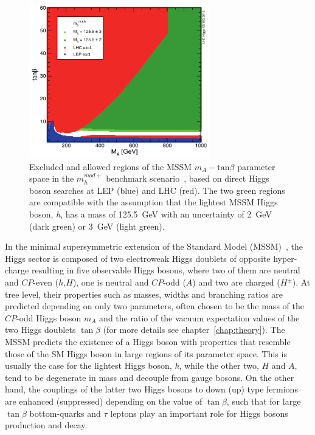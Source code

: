 \begin{figure}[tp]
     \begin{center}

            \includegraphics[width=0.7\textwidth]{figure/mh_mod.png}

    \end{center}
    \caption{Excluded and allowed regions of the MSSM  $m_{A} - \text{tan}\beta$ parameter space in the $m_{h}^{mod+}$ 
	benchmark scenario~\cite{LHCxsec}, based on direct Higgs boson searches at LEP 
	(blue) and LHC (red). The two green regions are compatible with the assumption that 
	the lightest MSSM Higgs boson, \emph{h}, has a mass of 125.5~GeV with an uncertainty of 2~GeV (dark green) 
	or 3~GeV (light green). }
   \label{fig:mhmod}
\end{figure}


In the minimal supersymmetric extension of the Standard Model
(MSSM)~\cite{MSSM1, MSSM2}, the Higgs sector is composed of two electroweak Higgs
doublets of opposite hyper-charge resulting in five observable Higgs
bosons, where two of them are neutral and $CP$-even
($h$,$H$), one is neutral and $CP$-odd ($A$) and two are charged
($H^\pm$).  At tree level, their properties such as masses, widths and
branching ratios are predicted depending on  only two parameters,
often chosen to be the mass of the $CP$-odd Higgs boson $m_A$ and
the ratio of the vacuum expectation values of the two Higgs doublets
$\tan\beta$ (for more details see chapter~\ref{chap:theory}).  
The MSSM predicts the existence of a Higgs boson with properties that  
resemble those of the SM Higgs boson in large regions of its parameter space. 
This is usually the case for the lightest Higgs boson, \emph{h}, while the other two, $H$ and $A$, 
tend to be degenerate in mass and decouple from gauge bosons.
On the other hand, the couplings of the latter two Higgs bosons to down (up) type fermions are enhanced
(suppressed) depending on the value of $\tan\beta$, such that for large $\tan\beta$
bottom-quarks and $\tau$ leptons  play an important role for Higgs bosons production and decay. 
 
